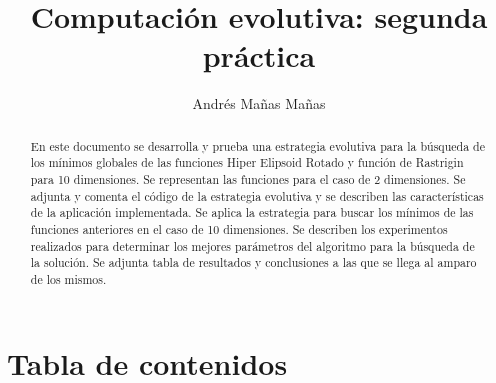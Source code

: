 \documentclass[11pt]{article}
\title{Computación evolutiva: segunda práctica}
\author{Andrés Mañas Mañas}
\begin{document}
\begin{titlepage}


    \maketitle

 
    \begin{abstract}
    En este documento se desarrolla y prueba una estrategia evolutiva para la búsqueda de los mínimos globales de las funciones Hiper Elipsoid Rotado y función de Rastrigin para 10 dimensiones. \newline \newline \hspace{15pt} Se representan las funciones para el caso de 2 dimensiones. \newline \newline \hspace{15pt} Se adjunta y comenta el código de la estrategia evolutiva y se describen las características de la aplicación implementada. \newline \newline \hspace{15pt} Se aplica la estrategia para buscar los mínimos de las funciones anteriores en el caso de 10 dimensiones. \newline \newline \hspace{15pt} Se describen los experimentos realizados para determinar los mejores parámetros del algoritmo para la búsqueda de la solución. \newline \newline \hspace{15pt} Se adjunta tabla de resultados y conclusiones a las que se llega al amparo de los mismos.
    \end{abstract}


\thispagestyle{empty}
\end{titlepage}

\clearpage

\setlength{\parindent}{30pt}

\headheight 40pt            
\headsep 20pt   

\pagestyle{fancy}

\setcounter{page}{1}

    
    \section{Tabla de contenidos}\label{tabla-de-contenidos}
\end{document}

